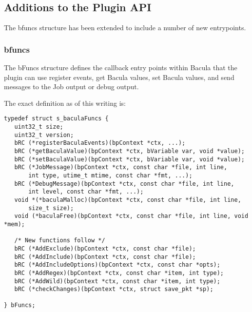 \subsection{Additions to the Plugin API}
The bfuncs structure has been extended to include a number of
new entrypoints.

\subsubsection{bfuncs}
The bFuncs structure defines the callback entry points within Bacula
that the plugin can use register events, get Bacula values, set
Bacula values, and send messages to the Job output or debug output.

The exact definition as of this writing is:
\begin{verbatim}
typedef struct s_baculaFuncs {
   uint32_t size;
   uint32_t version;
   bRC (*registerBaculaEvents)(bpContext *ctx, ...);
   bRC (*getBaculaValue)(bpContext *ctx, bVariable var, void *value);
   bRC (*setBaculaValue)(bpContext *ctx, bVariable var, void *value);
   bRC (*JobMessage)(bpContext *ctx, const char *file, int line,
       int type, utime_t mtime, const char *fmt, ...);
   bRC (*DebugMessage)(bpContext *ctx, const char *file, int line,
       int level, const char *fmt, ...);
   void *(*baculaMalloc)(bpContext *ctx, const char *file, int line,
       size_t size);
   void (*baculaFree)(bpContext *ctx, const char *file, int line, void *mem);
   
   /* New functions follow */
   bRC (*AddExclude)(bpContext *ctx, const char *file);
   bRC (*AddInclude)(bpContext *ctx, const char *file);
   bRC (*AddIncludeOptions)(bpContext *ctx, const char *opts);
   bRC (*AddRegex)(bpContext *ctx, const char *item, int type);
   bRC (*AddWild)(bpContext *ctx, const char *item, int type);
   bRC (*checkChanges)(bpContext *ctx, struct save_pkt *sp);

} bFuncs;
\end{verbatim}

